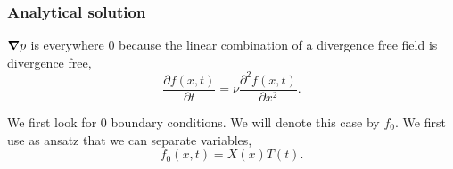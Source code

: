 \subsubsection{Analytical solution}

${\boldsymbol {\nabla}}p$ is everywhere 0 because the linear combination of a divergence free field is divergence free,
\begin{equation}
\frac{\partial f(x,t)}{\partial t}=\nu\frac{\partial^2 f(x,t)}{\partial x^2}.
\end{equation}

We first look for 0 boundary conditions. We will denote this case by $f_0$.
We first use as ansatz that we can separate variables,
\begin{equation}
 f_0(x,t)=X(x)T(t).
\end{equation}

